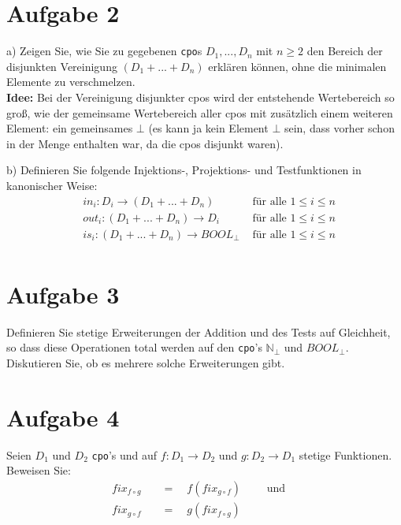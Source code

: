 \documentclass[ngerman,a4paper]{report}
\begin{document}
\section*{Aufgabe 2}
\begin{compactenum}
\item[a)] Zeigen Sie, wie Sie zu gegebenen \lstinline!cpo!s $D_1,...,D_n$ mit $n\geq 2$ den Bereich der disjunkten Vereinigung $(D_1 + ... + D_n)$ erklären können, ohne die minimalen Elemente zu verschmelzen.\\
\textbf{Idee:} 
Bei der Vereinigung disjunkter cpos wird der entstehende Wertebereich so groß, wie der gemeinsame Wertebereich aller cpos mit zusätzlich einem weiteren Element: ein gemeinsames $\bot$ (es kann ja kein Element $\bot$ sein, dass vorher schon in der Menge enthalten war, da die cpos disjunkt waren).
\item[b)] Definieren Sie folgende Injektions-, Projektions- und Testfunktionen in kanonischer Weise:\\
	\begin{align*}
		&in_i: D_i \rightarrow (D_1+...+D_n)& \text{ für alle } 1\leq i\leq n\\
		&out_i: (D_1+...+D_n)\rightarrow D_i& \text{ für alle } 1\leq i\leq n\\
		&is_i: (D_1+...+D_n)\rightarrow BOOL_\bot& \text{ für alle } 1\leq i\leq n\\
	\end{align*}
\end{compactenum}
\section*{Aufgabe 3}
Definieren Sie stetige Erweiterungen der Addition und des Tests auf Gleichheit, so dass diese Operationen total werden auf den \lstinline!cpo!'s $\mathbb{N}_\bot$ und $BOOL_\bot$. Diskutieren Sie, ob es mehrere solche Erweiterungen gibt.\\
\section*{Aufgabe 4}
Seien $D_1$ und $D_2$ \lstinline!cpo!'s und auf $f:D_1\rightarrow D_2$ und $g:D_2 \rightarrow D_1$ stetige Funktionen.\\
Beweisen Sie:\\
\begin{align*}
	fix_{f\circ g}\quad &= \quad f(fix_{g \circ f}) \quad\quad \text{ und }\\
	fix_{g\circ f}\quad &= \quad g(fix_{f\circ g}) &\\
\end{align*}
\end{document}
